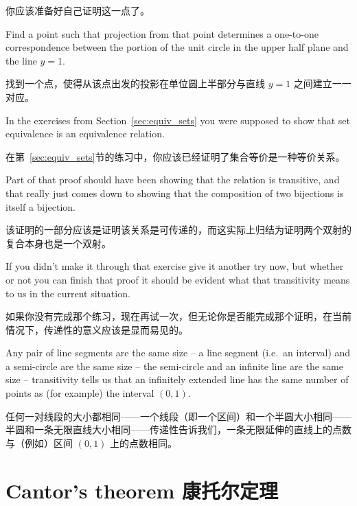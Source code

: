 你应该准备好自己证明这一点了。

\begin{exer}
    Find a point such that projection from that point determines a
    one-to-one correspondence between the portion of the unit circle in the upper
    half plane and the line $y = 1$.
\end{exer}

\begin{exer}
    找到一个点，使得从该点出发的投影在单位圆上半部分与直线 $y = 1$ 之间建立一一对应。
\end{exer}

In the exercises from Section~\ref{sec:equiv_sets} you were supposed
to show that set
equivalence is an equivalence relation.

在第~\ref{sec:equiv_sets}节的练习中，你应该已经证明了集合等价是一种等价关系。

Part of that proof should have been
showing that the relation is transitive, and that really just comes down to
showing that the composition of two bijections is itself a bijection.

该证明的一部分应该是证明该关系是可传递的，而这实际上归结为证明两个双射的复合本身也是一个双射。

If you
didn't make it through that exercise give it another try now, but whether
or not you can finish that proof it should be evident what that transitivity
means to us in the current situation.

如果你没有完成那个练习，现在再试一次，但无论你是否能完成那个证明，在当前情况下，传递性的意义应该是显而易见的。

Any pair of line segments are the same
size -- a line segment (i.e.\ an interval) and a semi-circle are the same size --
the semi-circle and an infinite line are the same size -- transitivity tells us that
an infinitely extended line has the same number of points as (for example)
the interval $(0, 1)$.

任何一对线段的大小都相同——一个线段（即一个区间）和一个半圆大小相同——半圆和一条无限直线大小相同——传递性告诉我们，一条无限延伸的直线上的点数与（例如）区间 $(0, 1)$ 上的点数相同。

\clearpage





\newpage

\section{Cantor's theorem 康托尔定理}
\label{sec:cantors_thm}

